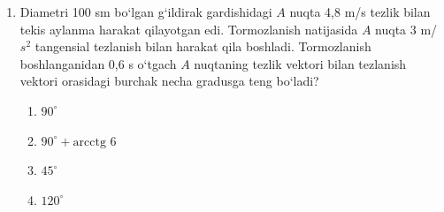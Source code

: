 \begin{enumerate}

\begin{enumerate}[label=\Alph*)]
\item 12,5
\item 50
\item 8
\item 18
\end{enumerate}

\item Diametri 100 sm bo‘lgan g‘ildirak gardishidagi $A$ nuqta 4,8 m/s tezlik bilan tekis aylanma harakat qilayotgan edi. Tormozlanish natijasida $A$ nuqta 3 m/$s^2$ tangensial tezlanish bilan harakat qila boshladi. Tormozlanish boshlanganidan 0,6 s o‘tgach $A$ nuqtaning tezlik vektori bilan tezlanish vektori orasidagi burchak necha gradusga teng bo‘ladi?
\begin{enumerate}[label=\Alph*)]
\item $90^\circ$
\item $90^\circ + \text{arcctg } 6$
\item $45^\circ$
\item $120^\circ$

\end{enumerate}

\end{enumerate}




